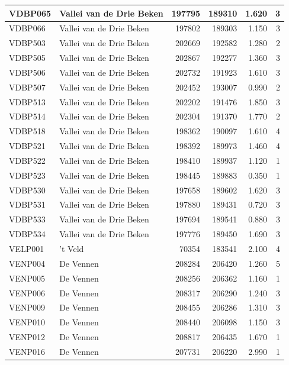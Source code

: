 \documentclass[11pt,]{book}
\begin{document}
\begin{table}
\begin{tabular}[t]{l|l|r|r|r|r}
\hline
VDBP065 & Vallei van de Drie Beken & 197795 & 189310 & 1.620 & 3\\
\hline
VDBP066 & Vallei van de Drie Beken & 197802 & 189303 & 1.150 & 3\\
\hline
VDBP503 & Vallei van de Drie Beken & 202669 & 192582 & 1.280 & 2\\
\hline
VDBP505 & Vallei van de Drie Beken & 202867 & 192277 & 1.360 & 3\\
\hline
VDBP506 & Vallei van de Drie Beken & 202732 & 191923 & 1.610 & 3\\
\hline
VDBP507 & Vallei van de Drie Beken & 202452 & 193007 & 0.990 & 2\\
\hline
VDBP513 & Vallei van de Drie Beken & 202202 & 191476 & 1.850 & 3\\
\hline
VDBP514 & Vallei van de Drie Beken & 202304 & 191370 & 1.770 & 2\\
\hline
VDBP518 & Vallei van de Drie Beken & 198362 & 190097 & 1.610 & 4\\
\hline
VDBP521 & Vallei van de Drie Beken & 198392 & 189973 & 1.460 & 4\\
\hline
VDBP522 & Vallei van de Drie Beken & 198410 & 189937 & 1.120 & 1\\
\hline
VDBP523 & Vallei van de Drie Beken & 198445 & 189883 & 0.350 & 1\\
\hline
VDBP530 & Vallei van de Drie Beken & 197658 & 189602 & 1.620 & 3\\
\hline
VDBP531 & Vallei van de Drie Beken & 197880 & 189431 & 0.720 & 3\\
\hline
VDBP533 & Vallei van de Drie Beken & 197694 & 189541 & 0.880 & 3\\
\hline
VDBP534 & Vallei van de Drie Beken & 197776 & 189450 & 1.690 & 3\\
\hline
VELP001 & 't Veld & 70354 & 183541 & 2.100 & 4\\
\hline
VENP004 & De Vennen & 208284 & 206420 & 1.260 & 5\\
\hline
VENP005 & De Vennen & 208256 & 206362 & 1.160 & 1\\
\hline
VENP006 & De Vennen & 208317 & 206290 & 1.240 & 3\\
\hline
VENP009 & De Vennen & 208455 & 206286 & 1.310 & 3\\
\hline
VENP010 & De Vennen & 208440 & 206098 & 1.150 & 3\\
\hline
VENP012 & De Vennen & 208817 & 206435 & 1.670 & 1\\
\hline
VENP016 & De Vennen & 207731 & 206220 & 2.990 & 1\\

\end{tabular}
\end{table}
\end{document}
